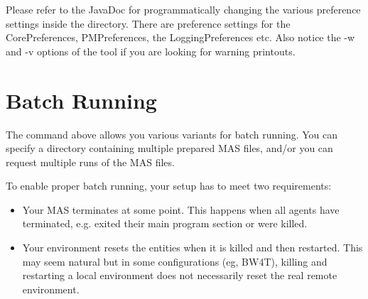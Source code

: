 \documentclass{book}
\begin{document}
Please refer to the JavaDoc for programmatically changing the various preference settings inside the
 directory. There are preference
settings for the CorePreferences, PMPreferences, the LoggingPreferences etc.
Also notice the -w and -v options of the tool if you are looking for warning printouts.

%
%
%
\section{Batch Running}
The  command above allows you various variants for batch running. You can specify a
directory containing multiple prepared MAS files, and/or you can request multiple runs of the MAS files. 

To enable proper batch running, your setup has to meet two requirements:

\begin{itemize}
\item Your MAS terminates at some point. This happens when all agents have terminated, e.g. exited their main program section or were killed.
\item Your environment resets the entities when it is killed and then restarted. This may seem natural but in
some configurations (eg, BW4T), killing and restarting a local environment does not necessarily reset the
real remote environment.
\end{itemize}




\end{document}
